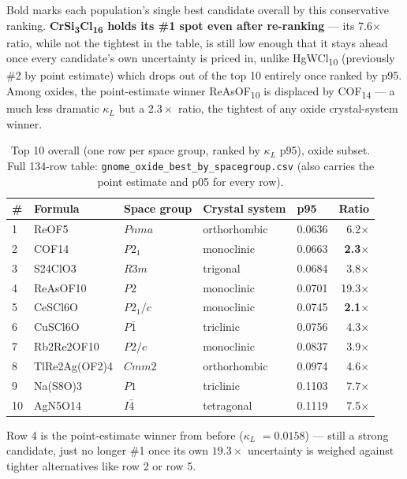 \documentclass[11pt,a4paper]{article}
\newcommand{\KL}{$\kappa_L$}
\begin{document}
\noindent
Bold marks each population's single best candidate overall by this
conservative ranking. \textbf{CrSi\textsubscript{3}Cl\textsubscript{16}
holds its \#1 spot even after re-ranking} --- its 7.6$\times$ ratio, while
not the tightest in the table, is still low enough that it stays ahead once
every candidate's own uncertainty is priced in, unlike
HgWCl\textsubscript{10} (previously \#2 by point estimate) which drops out
of the top 10 entirely once ranked by p95. Among oxides, the point-estimate
winner ReAsOF\textsubscript{10} is displaced by COF\textsubscript{14} ---
a much less dramatic \KL{} but a $2.3\times$ ratio, the tightest of any
oxide crystal-system winner.

\begin{table}[H]
\centering
\caption{Top 10 overall (one row per space group, ranked by \KL{} p95),
oxide subset. Full 134-row table:
\texttt{gnome\_oxide\_best\_by\_spacegroup.csv} (also carries the point
estimate and p05 for every row).}
\begin{tabular}{lllll r}
\toprule
\# & Formula & Space group & Crystal system & p95 & Ratio \\
\midrule
1  & ReOF5          & $Pnma$     & orthorhombic & 0.0636 & 6.2$\times$ \\
2  & COF14          & $P2_1$     & monoclinic   & 0.0663 & \textbf{2.3$\times$} \\
3  & S24ClO3        & $R3m$      & trigonal     & 0.0684 & 3.8$\times$ \\
4  & ReAsOF10       & $P2$       & monoclinic   & 0.0701 & 19.3$\times$ \\
5  & CeSCl6O        & $P2_1/c$   & monoclinic   & 0.0745 & \textbf{2.1$\times$} \\
6  & CuSCl6O        & $P\bar{1}$ & triclinic    & 0.0756 & 4.3$\times$ \\
7  & Rb2Re2OF10     & $P2/c$     & monoclinic   & 0.0837 & 3.9$\times$ \\
8  & TlRe2Ag(OF2)4  & $Cmm2$     & orthorhombic & 0.0974 & 4.6$\times$ \\
9  & Na(S8O)3       & $P1$       & triclinic    & 0.1103 & 7.7$\times$ \\
10 & AgN5O14        & $I\bar{4}$ & tetragonal   & 0.1119 & 7.5$\times$ \\
\bottomrule
\end{tabular}
\end{table}

\noindent
Row 4 is the point-estimate winner from before (\KL{} $=0.0158$) --- still a
strong candidate, just no longer \#1 once its own $19.3\times$ uncertainty
is weighed against tighter alternatives like row 2 or row 5.
\end{document}
